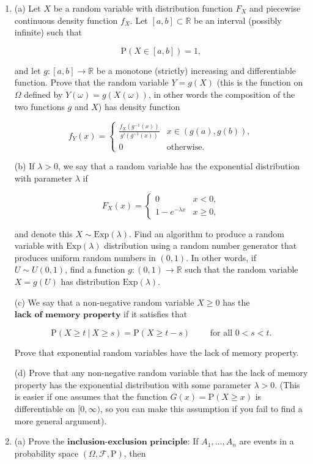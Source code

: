 \documentclass[11pt]{report}
\providecommand{\cal}{\mathcal}
\newcommand{\R}{\mathbb{R}}
\theoremstyle{plain}
\theoremstyle{definition}
\begin{document}
\begin{enumerate}[label=\arabic*.]
\item (a) Let $X$ be a random variable with distribution
function $F_X$ and piecewise continuous density
function $f_X$. Let $[a,b] \subset \R$ be an interval
(possibly infinite) such that

\[
\mathrm{P}(X \in [a,b]) = 1,
\]

\noindent and let $g:[a,b]\to\R$ be a monotone (strictly)
increasing and differentiable function. Prove that the
random variable $Y=g(X)$ (this is the function on
$\Omega$ defined by $Y(\omega) = g(X(\omega))$, in
other words the composition of the two functions $g$
and $X$) has density function

\[
f_Y(x) = \begin{cases} \frac{f_X(g^{-1}(x))}{g'(g^{-1}(x))} & x\in (g(a),g(b)), \\ 0 & \textrm{otherwise.} \end{cases}
\]

\noindent (b) If $\lambda>0$, we say that a random variable has
the exponential distribution with parameter $\lambda$
if

\[
F_X(x) = \begin{cases} 0 & x<0, \\ 1-e^{-\lambda x} & x \ge 0, \end{cases}
\]

\noindent and denote this $X \sim \textrm{Exp}(\lambda).$ Find
an algorithm to produce a random variable with
$\textrm{Exp}(\lambda)$ distribution using a random
number generator that produces uniform random numbers
in $(0,1)$. In other words, if $U \sim U(0,1)$, find
a function $g:(0,1)\to\R$ such that the random
variable $X=g(U)$ has distribution
$\textrm{Exp}(\lambda)$.

(c) We say that a non-negative random variable
$X\ge 0$ has the $\textbf{lack of memory property}$
if it satisfies that

\[
\mathrm{P}(X \ge t\ |\ X \ge s) = \mathrm{P}(X \ge t-s)\qquad \textrm{ for all $0<s<t$}.
\]

\noindent Prove that exponential random variables have the lack
of memory property.

(d) Prove that any non-negative random variable that
has the lack of memory property has the exponential
distribution with some parameter $\lambda>0$. (This
is easier if one assumes that the function
$G(x)=\mathrm{P}(X\ge x)$ is differentiable on
$[0,\infty)$, so you can make this assumption if you
fail to find a more general argument).

\item (a) Prove the
$\textbf{inclusion-exclusion principle}$: If
$A_1,\ldots,A_n$ are events in a probability space
$(\Omega, {\cal F}, \mathrm{P})$, then


\end{enumerate}
\end{document}
